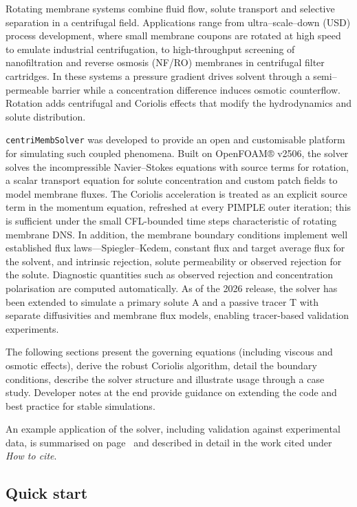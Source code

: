 \documentclass[11pt,a4paper]{article}
\begin{document}
Rotating membrane systems combine fluid flow, solute transport and
selective separation in a centrifugal field.  Applications range from
ultra–scale–down (USD) process development, where small membrane coupons
are rotated at high speed to emulate industrial centrifugation, to
high-throughput screening of nanofiltration and reverse osmosis (NF/RO)
membranes in centrifugal filter cartridges.  In these systems a
pressure gradient drives solvent through a semi–permeable barrier while
a concentration difference induces osmotic counterflow.  Rotation adds
centrifugal and Coriolis effects that modify the hydrodynamics and
solute distribution.

\texttt{centriMembSolver} was developed to provide an open and
customisable platform for simulating such coupled phenomena.  Built on
OpenFOAM® v2506, the solver solves the incompressible Navier–Stokes
equations with source terms for rotation, a scalar transport equation
for solute concentration and custom patch fields to model membrane
fluxes.  The Coriolis acceleration is treated as an explicit source
term in the momentum equation, refreshed at every PIMPLE outer
iteration; this is sufficient under the small CFL-bounded time steps
characteristic of rotating membrane DNS.  In addition, the membrane
boundary conditions
implement well established flux laws—Spiegler–Kedem, constant flux and
target average flux for the solvent, and intrinsic rejection, solute
permeability or observed rejection for the solute.  Diagnostic
quantities such as observed rejection and concentration polarisation are
computed automatically. As of the 2026 release, the solver has been extended to simulate a primary solute A and a passive tracer T with separate diffusivities and membrane flux models, enabling tracer-based validation experiments.

The following sections present the governing equations (including
viscous and osmotic effects), derive the robust Coriolis algorithm,
detail the boundary conditions, describe the solver structure and
illustrate usage through a case study.  Developer notes at the end
provide guidance on extending the code and best practice for stable
simulations.

An example application of the solver, including validation against
experimental data, is summarised on page~\pageref{sec:cases} and
described in detail in the work cited under \emph{How to cite}.

\subsection*{Quick start}
\end{document}
